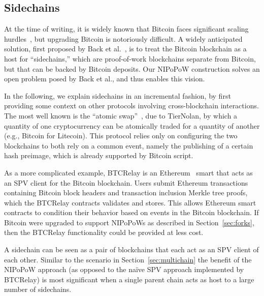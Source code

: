 \subsection{Sidechains}
\label{sec:sidechains}
At the time of writing, it is widely known that Bitcoin faces significant scaling hurdles~\cite{onscaling}, but upgrading Bitcoin is notoriously difficult.
A widely anticipated solution, first proposed by Back et al.~\cite{sidechains}, is to treat the Bitcoin blockchain as a host for ``sidechains,'' which are proof-of-work blockchains separate from Bitcoin, but that can be backed by Bitcoin deposits. Our NIPoPoW construction solves an open problem posed by Back et al., and thus enables this vision.

In the following, we explain sidechains in an incremental fashion, by first providing some context on other protocols involving cross-blockchain interactions. The most well known is the ``atomic swap''~\cite{tiernolan}, due to TierNolan, by which a quantity of one cryptocurrency can be atomically traded for a quantity of another (e.g., Bitcoin for Litecoin). This protocol relies only on configuring the two blockchains to both rely on a common event, namely the publishing of a certain hash preimage, which is already supported by Bitcoin script.

As a more complicated example, BTCRelay is an Ethereum~\cite{ethereum} smart  that acts as an SPV client for the Bitcoin blockchain.
Users submit Ethereum transactions containing Bitcoin block headers and transaction inclusion Merkle tree proofs, which the BTCRelay contracts validates and stores. This allows Ethereum smart contracts to condition their behavior based on events in the Bitcoin blockchain.
If Bitcoin were upgraded to support NIPoPoWs as described in Section~\ref{sec:forks}, then the BTCRelay functionality could be provided at less cost.

A sidechain can be seen as a pair of blockchains that each act as an SPV client of each other. Similar to the scenario in Section~\ref{sec:multichain} the benefit of the NIPoPoW approach (as opposed to the na\"ive SPV approach implemented by BTCRelay) is most significant when a single parent chain acts as host to a large number of sidechains.
